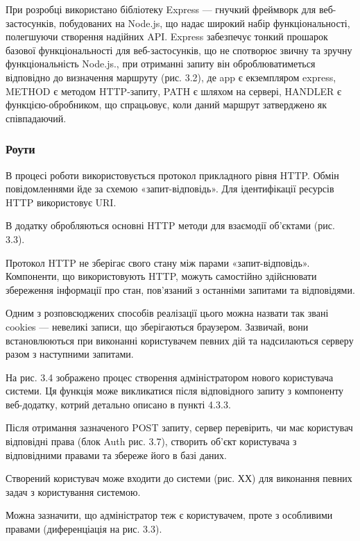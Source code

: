 При розробці використано бібліотеку Express — гнучкий фреймворк для веб-застосунків, побудованих на Node.js, що надає широкий набір функціональності, полегшуючи створення надійних API.
Express забезпечує тонкий прошарок базової функціональності для веб-застосунків, що не спотворює звичну та зручну функціональність Node.js., при отриманні запиту він оброблюватиметься відповідно до визначення маршруту (рис. 3.2), де app є екземпляром express, METHOD є методом HTTP-запиту, PATH є шляхом на сервері, HANDLER є функцією-обробником, що спрацьовує, коли даний маршрут затверджено як співпадаючий.


\subsubsection{Роути}

В процесі роботи використовується протокол прикладного рівня HTTP. Обмін повідомленнями йде за схемою «запит-відповідь». Для ідентифікації ресурсів HTTP використовує URI. 

В додатку обробляються основні  HTTP методи для взаємодії об’єктами (рис. 3.3). 


Протокол HTTP не зберігає свого стану між парами «запит-відповідь». Компоненти, що використовують HTTP, можуть самостійно здійснювати збереження інформації про стан, пов'язаний з останніми запитами та відповідями. 

Одним з розповсюджених способів реалізації цього можна назвати так звані cookies — невеликі записи, що зберігаються браузером. Зазвичай, вони встановлюються при виконанні користувачем певних дій та надсилаються серверу разом з наступними запитами. 

На рис. 3.4 зображено процес створення адміністратором нового користувача системи. Ця функція може викликатися після відповідного запиту з компоненту веб-додатку, котрий детально описано в пункті 4.3.3.

Після отримання зазначеного POST запиту, сервер перевірить, чи має користувач відповідні права (блок Auth рис. 3.7), створить об’єкт користувача з відповідними правами та збереже його в базі даних.

Створений користувач може входити до системи (рис. ХХ) для виконання певних задач з користування системою.

Можна зазначити, що адміністратор теж є користувачем, проте з особливими правами (диференціація на рис. 3.3).

